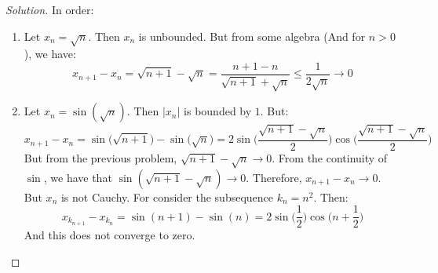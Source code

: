 \documentclass[crop=false,class=article,oneside]{standalone}
\begin{document}
        \begin{proof}[Solution]
            In order:
            \begin{enumerate}
                \item Let $x_{n}=\sqrt{n}$. Then
                      $x_{n}$ is unbounded.
                      But from some algebra (And for $n>0$),
                      we have:
                      \begin{equation*}
                          x_{n+1}-x_{n}
                          =\sqrt{n+1}-\sqrt{n}
                          =\frac{n+1-n}{\sqrt{n+1}+\sqrt{n}}
                          \leq\frac{1}{2\sqrt{n}}
                          \rightarrow{0}
                      \end{equation*}
                \item Let $x_{n}=\sin(\sqrt{n})$. Then $|x_{n}|$
                      is bounded by $1$. But:
                      \begin{equation*}
                          x_{n+1}-x_{n}
                          =\sin\big(
                              \sqrt{n+1})-\sin(\sqrt{n}
                          \big)
                          =2\sin\bigg(
                              \frac{\sqrt{n+1}-\sqrt{n}}{2}
                          \bigg)
                          \cos\bigg(
                              \frac{\sqrt{n+1}-\sqrt{n}}{2}
                          \bigg)
                      \end{equation*}
                      But from the previous problem,
                      $\sqrt{n+1}-\sqrt{n}\rightarrow{0}$.
                      From the continuity of $\sin$,
                      we have that
                      $\sin(\sqrt{n+1}-\sqrt{n})\rightarrow{0}$.
                      Therefore, $x_{n+1}-x_{n}\rightarrow{0}$.
                      But $x_{n}$ is not Cauchy. For consider
                      the subsequence $k_{n}=n^{2}$. Then:
                      \begin{equation*}
                          x_{k_{n+1}}-x_{k_{n}}
                          =\sin(n+1)-\sin(n)
                          =2\sin\big(\frac{1}{2}\big)
                           \cos\big(n+\frac{1}{2}\big)
                      \end{equation*}
                      And this does not converge to zero.
            \end{enumerate}
        \end{proof}
\end{document}
